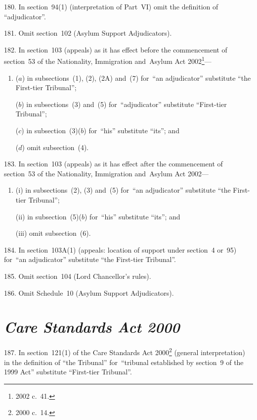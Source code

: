 \documentclass[12pt,a4paper]{article}
\begin{document}
\medskip

180.  In section~94(1) (interpretation of Part~VI) omit the definition of “adjudicator”.

\medskip

181.  Omit section~102 (Asylum Support Adjudicators).

\medskip

182.  In section~103 (appeals) as it has effect before the commencement of section~53 of the Nationality, Immigration and~Asylum Act 2002\footnote{2002 c.~41.}—
\begin{enumerate}\item[]
($a$) in subsections~(1), (2), (2A) and~(7) for~“an adjudicator” substitute “the First-tier Tribunal”;

($b$) in subsections~(3) and~(5) for~“adjudicator” substitute “First-tier Tribunal”;

($c$) in subsection~(3)($b$)  for~“his” substitute “its”; and

($d$) omit subsection~(4).
\end{enumerate}

\medskip

183.  In section~103 (appeals) as it has effect after the commencement of section~53 of the Nationality, Immigration and~Asylum Act 2002—
\begin{enumerate}\item[]
(i) in subsections~(2), (3) and~(5) for~“an adjudicator” substitute “the First-tier Tribunal”;

(ii) in subsection~(5)($b$)  for~“his” substitute “its”; and

(iii) omit subsection~(6).
\end{enumerate}

\medskip

184.  In section~103A(1) (appeals: location of support under section~4 or~95) for~“an adjudicator” substitute “the First-tier Tribunal”.

\medskip

185.  Omit section~104 (Lord Chancellor’s rules).

\medskip

186.  Omit Schedule~10 (Asylum Support Adjudicators).

\section*{\itshape Care Standards Act 2000}

187.  In section~121(1) of the Care Standards Act 2000\footnote{2000 c.~14.} (general interpretation) in the definition of “the Tribunal” for~“tribunal established by section~9 of the 1999 Act” substitute “First-tier Tribunal”.
\end{document}
